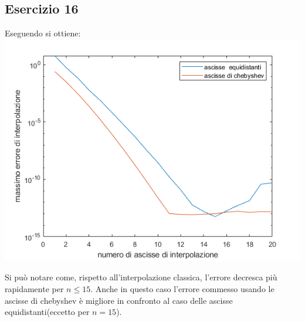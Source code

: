 \subsection{Esercizio 16}
Eseguendo  si ottiene:\\
\includegraphics[scale=0.8]{capitolo4/hermite.png}


Si può notare come, rispetto all'interpolazione classica, l'errore decresca più rapidamente per $n \le 15$. Anche in questo caso l'errore commesso usando le ascisse di chebyshev
è migliore in confronto al caso delle ascisse equidistanti(eccetto per $n=15$).